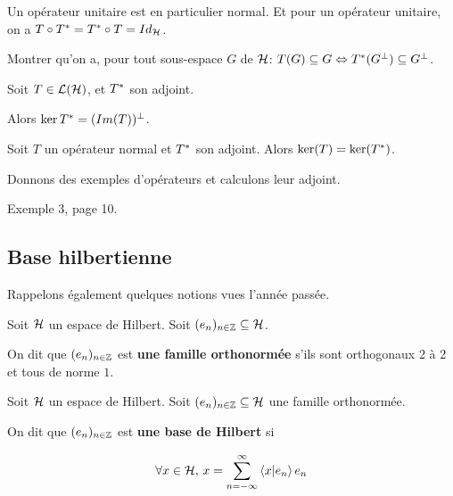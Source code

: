 \begin{remarque}
	Un opérateur unitaire est en particulier normal. Et pour un opérateur
	unitaire, on a $T \circ T^{*} = T^{*} \circ T =
	Id_{\mathcal{H}}$.
\end{remarque}

\begin{exercice}
	Montrer qu'on a, pour tout sous-espace $G$ de $\mathcal{H}$:
	$T(G) \subseteq G \Leftrightarrow T^{*}(G^{\perp}) \subseteq G^{\perp}$.
\end{exercice}

\begin{exercice} 
	\label{ex:ker_image_ortho_adjointe}
	Soit $T \in \mathcal{L}(\mathcal{H})$, et $T^{*}$ son adjoint.

	Alors $\ker{T^{*}} = (Im(T))^{\perp}$.
\end{exercice}

\begin{exercice}
	Soit $T$ un opérateur normal et $T^{*}$ son adjoint. Alors $\ker(T) =
	\ker(T^{*})$.
\end{exercice}

Donnons des exemples d'opérateurs et calculons leur adjoint.

\begin{exemple}
	Exemple 3, page 10.
\end{exemple}

\subsection{Base hilbertienne}

Rappelons également quelques notions vues l'année passée.

\begin{definition}
	Soit $\mathcal{H}$ un espace de Hilbert.
	Soit $(e_{n})_{n \in \mathbb{Z}} \subseteq \mathcal{H}$.

	On dit que $(e_{n})_{n \in \mathbb{Z}}$ est \textbf{une famille
	orthonormée} s'ils sont orthogonaux 2 à 2 et tous de norme $1$.
\end{definition}

\begin{definition}
	Soit $\mathcal{H}$ un espace de Hilbert.
	Soit $(e_{n})_{n \in \mathbb{Z}} \subseteq \mathcal{H}$ une famille
	orthonormée.

	On dit que $(e_{n})_{n \in \mathbb{Z}}$ est \textbf{une base de Hilbert} si

	\begin{equation}
	\forall x \in \mathcal{H}, \, x = \displaystyle \sum_{n = -\infty}^{\infty}
	\bra{x}\ket{e_{n}} e_{n}
	\end{equation}
\end{definition}


